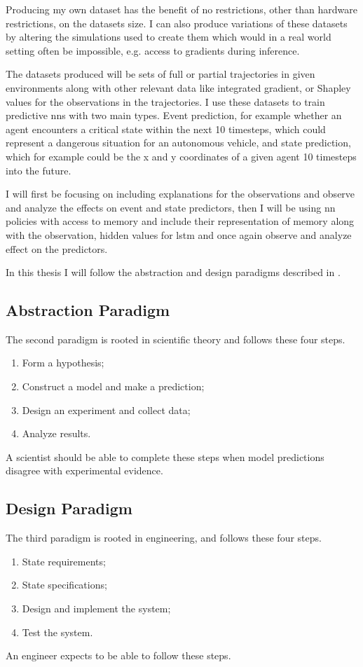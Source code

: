 \documentclass[UKenglish]{uiomasterthesis}
\begin{document}
Producing my own dataset has the benefit of no restrictions, other than hardware restrictions, on the datasets size. I can also produce variations of these datasets by altering the simulations used to create them which would in a real world setting often be impossible, e.g. access to gradients during inference.

The datasets produced will be sets of full or partial trajectories in given environments along with other relevant data like integrated gradient, or Shapley values for the observations in the trajectories. I use these datasets to train predictive \acp{nn} with two main types. Event prediction, for example whether an agent encounters a critical state within the next 10 timesteps, which could represent a dangerous situation for an autonomous vehicle, and state prediction, which for example could be the x and y coordinates of a given agent 10 timesteps into the future.

I will first be focusing on including explanations for the observations and observe and analyze the effects on event and state predictors, then I will be using \ac{nn} policies with access to memory and include their representation of memory along with the observation, hidden values for \ac{lstm} and once again observe and analyze effect on the predictors.

In this thesis I will follow the abstraction and design paradigms described in \cite{acm}.

\subsection{Abstraction Paradigm}
The second paradigm is rooted in scientific theory and follows these four steps.
\begin{enumerate}
    \item Form a hypothesis;
    \item Construct a model and make a prediction;
    \item Design an experiment and collect data;
    \item Analyze results.
\end{enumerate}
A scientist should be able to complete these steps when model predictions disagree with experimental evidence.


\subsection{Design Paradigm}
The third paradigm is rooted in engineering, and follows these four steps.
\begin{enumerate}
    \item State requirements;
    \item State specifications;
    \item Design and implement the system;
    \item Test the system.
\end{enumerate}
An engineer expects to be able to follow these steps.
\end{document}
